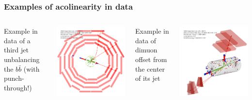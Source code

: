 \documentclass[compress]{beamer}
\begin{document}
\begin{frame}
\frametitle{Examples of acolinearity in data}
\begin{columns}
\centering Example in data of a third jet unbalancing the $b\bar{b}$ {\scriptsize (with punch-through!)}

\includegraphics[width=\linewidth]{dimuorphan_eventdisplay_thirdjet.png}

\centering Example in data of dimuon offset from the center of its jet

\includegraphics[width=\linewidth]{dimuorphan_eventdisplay_outofjet.png}
\end{columns}


\end{frame}
\end{document}
